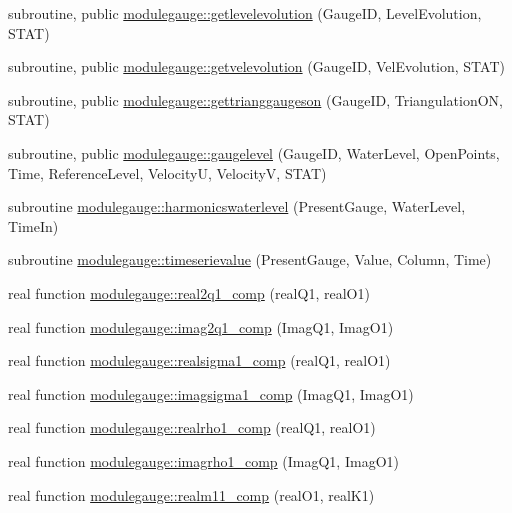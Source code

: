 \begin{DoxyCompactItemize}
\item 
subroutine, public \mbox{\hyperlink{namespacemodulegauge_aeb445b9f9d227121a220ceafb472ec2c}{modulegauge\+::getlevelevolution}} (Gauge\+ID, Level\+Evolution, S\+T\+AT)
\item 
subroutine, public \mbox{\hyperlink{namespacemodulegauge_af4997d45043f601c961fd7d153c0b413}{modulegauge\+::getvelevolution}} (Gauge\+ID, Vel\+Evolution, S\+T\+AT)
\item 
subroutine, public \mbox{\hyperlink{namespacemodulegauge_a0912cebda10faa15469d951016b5db0e}{modulegauge\+::gettrianggaugeson}} (Gauge\+ID, Triangulation\+ON, S\+T\+AT)
\item 
subroutine, public \mbox{\hyperlink{namespacemodulegauge_a40e51c18500557c90968e17a5ec8a550}{modulegauge\+::gaugelevel}} (Gauge\+ID, Water\+Level, Open\+Points, Time, Reference\+Level, VelocityU, VelocityV, S\+T\+AT)
\item 
subroutine \mbox{\hyperlink{namespacemodulegauge_a7de5a32e5ee02eaed3c8a598bbb65cb9}{modulegauge\+::harmonicswaterlevel}} (Present\+Gauge, Water\+Level, Time\+In)
\item 
subroutine \mbox{\hyperlink{namespacemodulegauge_ae7a26f230136e4737c871ba19b1d1529}{modulegauge\+::timeserievalue}} (Present\+Gauge, Value, Column, Time)
\item 
real function \mbox{\hyperlink{namespacemodulegauge_a3570d6ed4834d7d873f7b068c99c9ef5}{modulegauge\+::real2q1\+\_\+comp}} (real\+Q1, real\+O1)
\item 
real function \mbox{\hyperlink{namespacemodulegauge_ab71fe2294ae9095789c94992c6add8bf}{modulegauge\+::imag2q1\+\_\+comp}} (Imag\+Q1, Imag\+O1)
\item 
real function \mbox{\hyperlink{namespacemodulegauge_a639e6e7756ddc09a7f1410460b232db1}{modulegauge\+::realsigma1\+\_\+comp}} (real\+Q1, real\+O1)
\item 
real function \mbox{\hyperlink{namespacemodulegauge_af07cc0a3df0d15cac79f031de3fb79a7}{modulegauge\+::imagsigma1\+\_\+comp}} (Imag\+Q1, Imag\+O1)
\item 
real function \mbox{\hyperlink{namespacemodulegauge_aa1a4b7af3abfc8dfce0801b6c016f928}{modulegauge\+::realrho1\+\_\+comp}} (real\+Q1, real\+O1)
\item 
real function \mbox{\hyperlink{namespacemodulegauge_ab3aa99d6bca64d01ca7e09d41c9bd6f9}{modulegauge\+::imagrho1\+\_\+comp}} (Imag\+Q1, Imag\+O1)
\item 
real function \mbox{\hyperlink{namespacemodulegauge_a50f7735172ff499a2539356846ac25a7}{modulegauge\+::realm11\+\_\+comp}} (real\+O1, real\+K1)

\end{DoxyCompactItemize}
